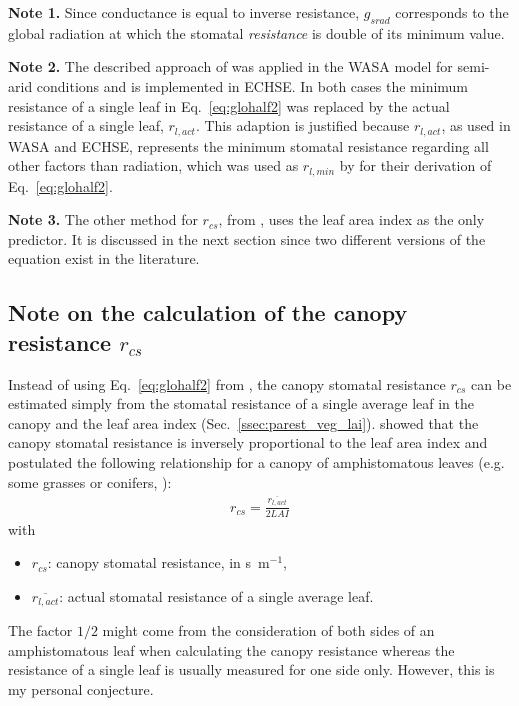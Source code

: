 \documentclass{scrreprt}
\newenvironment{denseitem}{
  \begin{itemize}
    \setlength{\itemsep}{0pt}
    \setlength{\parskip}{0pt}
    \setlength{\parsep}{0pt}
}{
  \end{itemize}
}
\begin{document}
\textbf{Note 1.}
Since conductance is equal to inverse resistance, $g_{srad}$ corresponds to the global radiation at which the stomatal \emph{resistance} is double of its minimum value.

\textbf{Note 2.}
The described approach of \citet{saugier91} was applied in the WASA model for semi-arid conditions \citep{guentner02} and is implemented in ECHSE.
In both cases the minimum resistance of a single leaf in Eq.~\eqref{eq:glohalf2} was replaced by the actual resistance of a single leaf, $r_{l,act}$.
This adaption is justified because $r_{l,act}$, as used in WASA and ECHSE, represents the minimum stomatal resistance regarding all other factors than radiation, which was used as $r_{l,min}$ by \citet{saugier91} for their derivation of Eq.~\eqref{eq:glohalf2}.

\textbf{Note 3.}
The other method for $r_{cs}$, from \citet{shuttleworth85}, uses the leaf area index as the only predictor.
It is discussed in the next section since two different versions of the equation exist in the literature.

\subsection{Note on the calculation of the canopy resistance $r_{cs}$} \label{ssec:parest_veg_notercs}

Instead of using Eq.~\eqref{eq:glohalf2} from \citet{saugier91}, the canopy stomatal resistance $r_{cs}$ can be estimated simply from the stomatal resistance of a single average leaf in the canopy and the leaf area index (Sec.~\ref{ssec:parest_veg_lai}).
\citet{shuttleworth76} showed that the canopy stomatal resistance is inversely proportional to the leaf area index and postulated the following relationship for a canopy of amphistomatous leaves (e.g. some grasses or conifers, \citealt{shuttleworth85}):
\begin{align} \label{eq:notercs1}
  r_{cs} = \frac{\overline{r_{l,act}}}{2 LAI}
\end{align}
%
with
\begin{denseitem}
  \item[] $r_{cs}$: canopy stomatal resistance, in s~m$^{-1}$,
  \item[] $\overline{r_{l,act}}$: actual stomatal resistance of a single average leaf.
\end{denseitem}
%
The factor $1/2$ might come from the consideration of both sides of an amphistomatous leaf when calculating the canopy resistance whereas the resistance of a single leaf is usually measured for one side only.
However, this is my personal conjecture.
\end{document}
